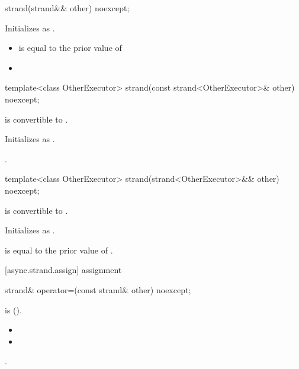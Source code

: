 \begin{itemdecl}
strand(strand&& other) noexcept;
\end{itemdecl}

\begin{itemdescr}
\pnum
\effects Initializes  as .

\pnum
\postconditions 
\begin{itemize}
\item
{} is equal to the prior value of 
\item
{}
\end{itemize}
\end{itemdescr}

\begin{itemdecl}
template<class OtherExecutor> strand(const strand<OtherExecutor>& other) noexcept;
\end{itemdecl}

\begin{itemdescr}
\pnum
\requires {} is convertible to .

\pnum
\effects Initializes  as .

\pnum
\postconditions {}.
\end{itemdescr}

\begin{itemdecl}
template<class OtherExecutor> strand(strand<OtherExecutor>&& other) noexcept;
\end{itemdecl}

\begin{itemdescr}
\pnum
\requires {} is convertible to .

\pnum
\effects Initializes  as .

\pnum
\postconditions {} is equal to the prior value of .
\end{itemdescr}



[async.strand.assign]{ assignment}

\begin{itemdecl}
strand& operator=(const strand& other) noexcept;
\end{itemdecl}

\begin{itemdescr}
\pnum
\requires {} is  ().

\pnum
\postconditions 
\begin{itemize}
\item
{}
\item
{}
\end{itemize}

\pnum
\returns {}.
\end{itemdescr}


